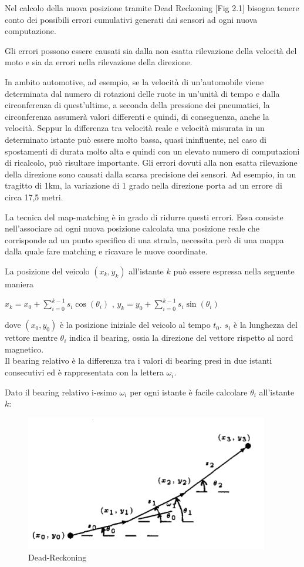 \documentclass[12pt,a4paper,openright,twoside]{report}
\begin{document}
Nel calcolo della nuova posizione tramite Dead Reckoning [Fig 2.1] bisogna tenere conto dei possibili errori cumulativi generati dai sensori ad ogni nuova computazione. 

Gli errori possono essere causati sia dalla non esatta rilevazione della velocità del moto e sia da errori nella rilevazione della direzione.

In ambito automotive, ad esempio, se la velocità di un'automobile viene determinata dal numero di rotazioni delle ruote in un'unità di tempo e dalla circonferenza di quest'ultime, a seconda della pressione dei pneumatici, la circonferenza assumerà valori differenti e quindi, di conseguenza, anche la velocità. 
Seppur la differenza tra velocità reale e velocità misurata in un determinato istante può essere molto bassa, quasi ininfluente, nel caso di spostamenti di durata molto alta e quindi con un elevato numero di computazioni di ricalcolo, può risultare importante.
Gli errori dovuti alla non esatta rilevazione della direzione sono causati dalla scarsa precisione dei sensori. Ad esempio, in un tragitto di 1km, la variazione di 1 grado nella direzione porta ad un errore di circa 17,5 metri.


La tecnica del map-matching \cite{K8} è in grado di ridurre questi errori. Essa consiste nell'associare ad ogni nuova posizione calcolata una posizione reale che corrisponde ad un punto specifico di una strada, necessita però di una mappa dalla quale fare matching e ricavare le nuove coordinate.

La posizione del veicolo $(x_k, y_k)$ all'istante $k$ può essere espressa nella seguente maniera \cite{K9}
\begin{center}
$x_k = x_0 + \sum_{i=0}^{k-1} s_i  \cos( \theta_i) $ ,      $y_k = y_0 + \sum_{i=0}^{k-1} s_i  \sin( \theta_i)  $
\end{center}
dove $(x_0, y_0)$ è la posizione iniziale del veicolo al tempo $t_0 $. $s_i$ è la lunghezza del vettore mentre $ \theta_i $ indica il bearing, ossia la direzione del vettore rispetto al nord magnetico.\\
Il bearing relativo è la differenza tra i valori di bearing presi in due istanti consecutivi ed è rappresentata con la lettera $\omega_i $.

Dato il bearing relativo i-esimo $\omega_i$ per ogni istante è facile calcolare $\theta_i$ all'istante $k$:

\begin{figure}[h] 
\centering 
\includegraphics[scale=0.8]{fig1} 
\caption{Dead-Reckoning} 
\end{figure}
\end{document}

